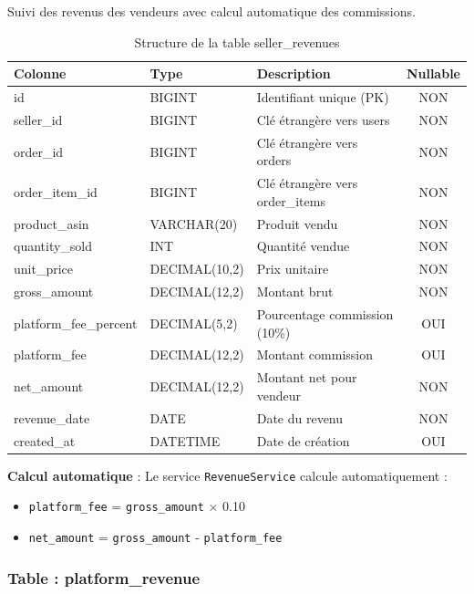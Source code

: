 \documentclass[12pt,a4paper]{report}
\begin{document}
Suivi des revenus des vendeurs avec calcul automatique des commissions.

\begin{table}[H]
    \centering
    \caption{Structure de la table seller\_revenues}
    \begin{tabularx}{\textwidth}{llXc}
        \toprule
        \textbf{Colonne} & \textbf{Type} & \textbf{Description} & \textbf{Nullable} \\
        \midrule
        id & BIGINT & Identifiant unique (PK) & NON \\
        seller\_id & BIGINT & Clé étrangère vers users & NON \\
        order\_id & BIGINT & Clé étrangère vers orders & NON \\
        order\_item\_id & BIGINT & Clé étrangère vers order\_items & NON \\
        product\_asin & VARCHAR(20) & Produit vendu & NON \\
        quantity\_sold & INT & Quantité vendue & NON \\
        unit\_price & DECIMAL(10,2) & Prix unitaire & NON \\
        gross\_amount & DECIMAL(12,2) & Montant brut & NON \\
        platform\_fee\_percent & DECIMAL(5,2) & Pourcentage commission (10\%) & OUI \\
        platform\_fee & DECIMAL(12,2) & Montant commission & OUI \\
        net\_amount & DECIMAL(12,2) & Montant net pour vendeur & NON \\
        revenue\_date & DATE & Date du revenu & NON \\
        created\_at & DATETIME & Date de création & OUI \\
        \bottomrule
    \end{tabularx}
    \label{tab:seller_revenues}
\end{table}

\textbf{Calcul automatique} : Le service \texttt{RevenueService} calcule automatiquement :
\begin{itemize}[noitemsep]
    \item \texttt{platform\_fee} = \texttt{gross\_amount} × 0.10
    \item \texttt{net\_amount} = \texttt{gross\_amount} - \texttt{platform\_fee}
\end{itemize}

\subsubsection{Table : platform\_revenue}
\end{document}

